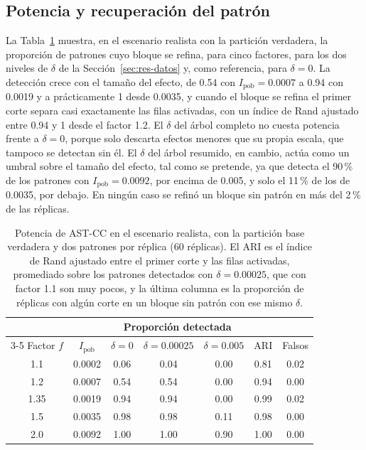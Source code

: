 \subsection{Potencia y recuperación del patrón}

La Tabla~\ref{tab:res-potencia} muestra, en el escenario realista con la
partición verdadera, la proporción de patrones cuyo bloque se refina, para cinco
factores, para los dos niveles de $\delta$ de la Sección~\ref{sec:res-datos} y,
como referencia, para $\delta = 0$. La
detección crece con el tamaño del efecto, de 0.54 con $I_{\mathrm{pob}} = 0.0007$
a 0.94 con 0.0019 y a prácticamente 1 desde 0.0035, y cuando el bloque se refina el
primer corte separa casi exactamente las filas activadas, con un índice de Rand
ajustado entre 0.94 y 1 desde el factor 1.2. El $\delta$ del árbol completo no cuesta
potencia frente a $\delta = 0$, porque solo descarta efectos menores que su propia
escala, que tampoco se detectan sin él. El $\delta$ del árbol resumido, en cambio,
actúa como un umbral sobre el tamaño del efecto, tal como se pretende, ya que
detecta el 90\,\% de los patrones con $I_{\mathrm{pob}} = 0.0092$, por encima de
0.005, y solo el 11\,\% de los de 0.0035, por debajo. En ningún caso se refinó
un bloque sin patrón en más del 2\,\% de las réplicas.

\begin{table}[t]
\centering
\small
\begin{tabular}{@{}ccccccc@{}}
\toprule
 & & \multicolumn{3}{c}{Proporción detectada} & & \\
\cmidrule(lr){3-5}
Factor $f$ & $I_{\mathrm{pob}}$ & $\delta = 0$ & $\delta = 0.00025$ & $\delta = 0.005$ & ARI & Falsos \\
\midrule
1.1  & 0.0002 & 0.06 & 0.04 & 0.00 & 0.81 & 0.02 \\
1.2  & 0.0007 & 0.54 & 0.54 & 0.00 & 0.94 & 0.00 \\
1.35 & 0.0019 & 0.94 & 0.94 & 0.00 & 0.99 & 0.02 \\
1.5  & 0.0035 & 0.98 & 0.98 & 0.11 & 0.98 & 0.00 \\
2.0  & 0.0092 & 1.00 & 1.00 & 0.90 & 1.00 & 0.00 \\
\bottomrule
\end{tabular}
\caption{Potencia de AST-CC en el escenario realista, con la partición base
verdadera y dos patrones por réplica (60 réplicas). El ARI es el índice de Rand
ajustado entre el primer corte y las filas activadas, promediado sobre los patrones
detectados con $\delta = 0.00025$, que con factor 1.1 son muy pocos, y la última columna es la proporción de
réplicas con algún corte en un bloque sin patrón con ese mismo $\delta$.}
\label{tab:res-potencia}
\end{table}

